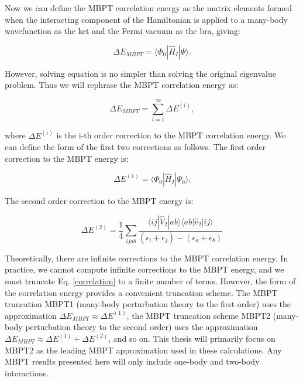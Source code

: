 Now we can define the MBPT correlation energy as the matrix elements formed when the interacting component of the Hamiltonian is applied to a many-body wavefunction as the ket and the Fermi vacuum as the bra, giving:

\begin{equation}
    \Delta E_{MBPT} = \langle \Phi_0 | \hat{H}_I | \Psi \rangle.
\end{equation}

However, solving equation is no simpler than solving the original eigenvalue problem. Thus we will rephrase the MBPT correlation energy as:

\begin{equation} \label{correlation}
    \Delta E_{MBPT} = \sum_{i=1}^\infty \Delta E^{(i)},
\end{equation}

where $\Delta E^{(i)}$ is the i-th order correction to the MBPT correlation energy. We can define the form of the first two corrections as follows. The first order correction to the MBPT energy is:

\begin{equation}
    \Delta E^{(1)} = \langle \Phi_0 | \hat{H}_I | \Psi_0 \rangle.
\end{equation}

The second order correction to the MBPT energy is: 

\begin{equation}
    \Delta E^{(2)} = \frac{1}{4} \sum_{ijab} \frac{\langle ij | \hat{V}_2 | ab \rangle \langle ab | \hat{v}_2 | ij \rangle}{(\epsilon_i + \epsilon_j) - (\epsilon_a + \epsilon_b)}
\end{equation}

Theoretically, there are infinite corrections to the MBPT correlation energy. In practice, we cannot compute infinite corrections to the MBPT energy, and we must truncate Eq. \ref{correlation} to a finite number of terms. However, the form of the correlation energy provides a convenient truncation scheme. The MBPT truncation MBPT1 (many-body perturbation theory to the first order) uses the approximation $\Delta E_{MBPT} \approx \Delta E^{(1)}$, the MBPT truncation scheme MBPT2 (many-body perturbation theory to the second order) uses the approximation $\Delta E_{MBPT} \approx \Delta E^{(1)} + \Delta E^{(2)}$, and so on. This thesis will primarily focus on MBPT2 as the leading MBPT approximation used in these calculations. Any MBPT results presented here will only include one-body and two-body interactions.
